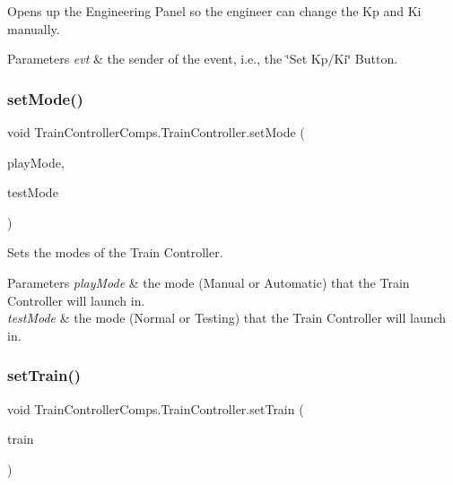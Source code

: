 Opens up the Engineering Panel so the engineer can change the Kp and Ki manually. 


\begin{DoxyParams}{Parameters}
{\em evt} & the sender of the event, i.\+e., the \char`\"{}\+Set Kp/\+Ki\char`\"{} Button. \\
\hline
\end{DoxyParams}
\mbox{\label{classTrainControllerComps_1_1TrainController_a5f7d0db2d1b3da0c43a85bc0ca38f9a4}} 
\subsubsection{\texorpdfstring{set\+Mode()}{setMode()}}
{\footnotesize\ttfamily void Train\+Controller\+Comps.\+Train\+Controller.\+set\+Mode (\begin{DoxyParamCaption}\item[{String}]{play\+Mode,  }\item[{String}]{test\+Mode }\end{DoxyParamCaption})\hspace{0.3cm}{\ttfamily [private]}}



Sets the modes of the Train Controller. 


\begin{DoxyParams}{Parameters}
{\em play\+Mode} & the mode (Manual or Automatic) that the Train Controller will launch in. \\
\hline
{\em test\+Mode} & the mode (Normal or Testing) that the Train Controller will launch in. \\
\hline
\end{DoxyParams}
\mbox{\label{classTrainControllerComps_1_1TrainController_a3866dec9cadf09228d1fc1173f824035}} 
\subsubsection{\texorpdfstring{set\+Train()}{setTrain()}}
{\footnotesize\ttfamily void Train\+Controller\+Comps.\+Train\+Controller.\+set\+Train (\begin{DoxyParamCaption}\item[{\hyperlink{classTrainControllerComps_1_1TestTrain}{Test\+Train}}]{train }\end{DoxyParamCaption})\hspace{0.3cm}{\ttfamily [private]}}



